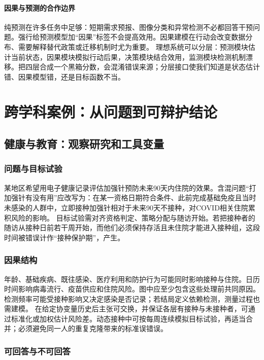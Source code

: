 \paragraph{因果与预测的合作边界}

纯预测在许多任务中足够：短期需求预报、图像分类和异常检测不必都回答干预问题。强行给预测模型加“因果”标签不会提高效用。因果建模在行动会改变数据分布、需要解释替代政策或迁移机制时尤为重要。
理想系统可以分层：预测模块估计当前状态，因果模块模拟行动后果，决策模块结合效用，监测模块检测机制漂移。把四层合成一个黑箱分数，会混淆错误来源；分层接口使我们知道是状态估计错、因果模型错，还是目标函数不当。

\section{跨学科案例：从问题到可辩护结论}

\subsection{健康与教育：观察研究和工具变量}

\subsubsection{问题与目标试验}

某地区希望用电子健康记录评估加强针预防未来90天内住院的效果。含混问题“打加强针有没有用”应改写为：在某一资格日期符合条件、此前完成基础免疫且当时未感染的人群中，立即接种加强针相对于未来90天不接种，对COVID相关住院累积风险的影响。
目标试验需对齐资格判定、策略分配与随访开始。若把接种者的随访从接种日前若干周开始，而他们必须保持存活且未住院才能进入接种组，这段时间被错误计作“接种保护期”，产生。

\subsubsection{因果结构}

年龄、基础疾病、既往感染、医疗利用和防护行为可能同时影响接种与住院。日历时间影响病毒流行、疫苗供应和住院风险。图中应至少包含这些处理前共同原因。检测频率可能受接种影响又决定感染是否记录；若结局定义依赖检测，测量过程也需建模。
在给定协变量历史后主张可交换，并保证各层有接种与未接种者，可通过标准化或加权估计风险差。动态接种中可按每周连续模拟目标试验，再适当合并；必须避免同一人的重复克隆带来的标准误错误。

\subsubsection{可回答与不可回答}

